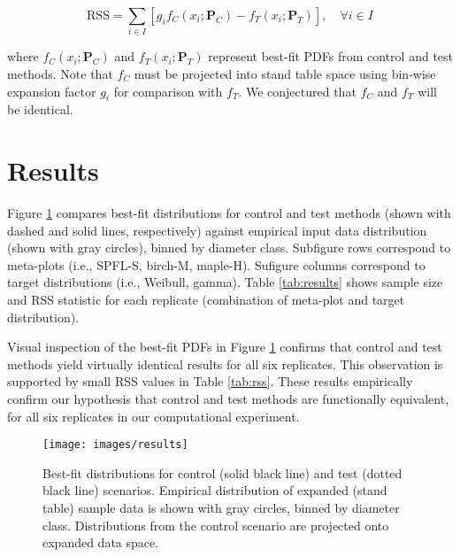 \message{ !name(hpsdistfit_article.tex)}\documentclass{article}
\begin{document}
\begin{equation*}
  \text{RSS} = \sum_{i \in I}\left[g_i f_C(x_i; \bm{P}_C) - f_T(x_i; \bm{P}_T)  \right], \quad \forall i \in I
\end{equation*}

where $f_C(x_i; \bm{P}_C)$ and $f_T(x_i; \bm{P}_T)$ represent best-fit
PDFs from control and test methods.
Note that $f_C$ must be projected into stand table space using
bin-wise expansion factor $g_i$ for comparison with $f_T$. 
We conjectured that $f_C$ and $f_T$ will be identical. 

\section{Results}
\label{sec:results}

Figure \ref{fig:results} compares best-fit distributions for control
and test methods (shown with dashed and solid lines, respectively) against empirical input data distribution (shown with gray circles), binned by
diameter class.
  Subfigure rows correspond to meta-plots (i.e., SPFL-S, birch-M, maple-H).
  Sufigure columns correspond to target distributions (i.e., Weibull, gamma).
  Table \ref{tab:results} shows sample size and RSS statistic for each
  replicate (combination of meta-plot and target distribution). 

  Visual inspection of the best-fit PDFs in Figure \ref{fig:results}
  confirms that control and test methods yield virtually identical
  results for all six replicates.
  This observation is supported by small RSS values in Table
  \ref{tab:rss}.
  These results empirically confirm our hypothesis that control and
  test methods are functionally equivalent, for all six replicates in
  our computational experiment.
  
  
\begin{figure}[h!]
  \centering
  \texttt{[image: images/results]}
  \caption{Best-fit distributions for control (solid black line) and test (dotted black line) scenarios. Empirical distribution of expanded (stand table) sample data is shown with gray circles, binned by diameter class. Distributions from the control scenario are projected onto expanded data space.}
  \label{fig:results}
\end{figure}
\end{document}
